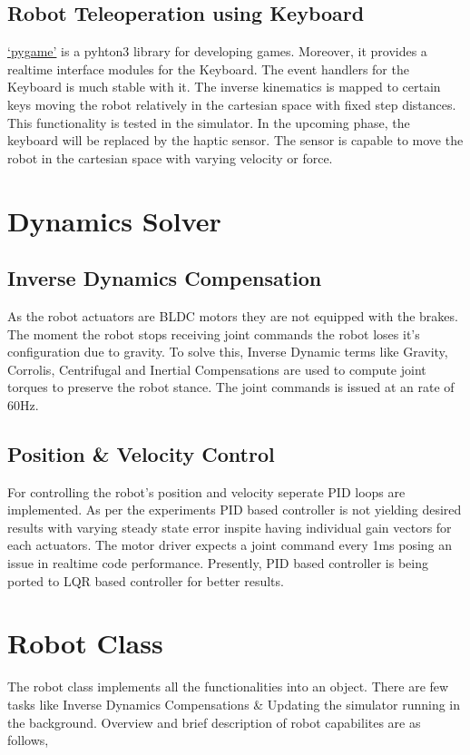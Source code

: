 \documentclass[12pt]{article}
\begin{document}
        \subsection{Robot Teleoperation using Keyboard}
            \href{https://www.pygame.org/docs/}{`pygame'} is a pyhton3 library for developing games. 
            Moreover, it provides a realtime interface modules for the Keyboard. The event handlers for the Keyboard is much stable with it.
            The inverse kinematics is mapped to certain keys moving the robot relatively in the cartesian space with fixed step distances. 
            This functionality is tested in the simulator. In the upcoming phase, the keyboard will be replaced by the haptic sensor.
            The sensor is capable to move the robot in the cartesian space with varying velocity or force.

\section{Dynamics Solver}
    \subsection{Inverse Dynamics Compensation}
        As the robot actuators are BLDC motors they are not equipped with the brakes. 
        The moment the robot stops receiving joint commands the robot loses it's configuration due to gravity.
        To solve this, Inverse Dynamic terms like Gravity, Corrolis, Centrifugal and Inertial Compensations are used to compute joint torques to preserve the robot stance.
        The joint commands is issued at an rate of 60Hz.

    \subsection{Position \& Velocity Control}
        For controlling the robot's position and velocity seperate PID loops are implemented. 
        As per the experiments PID based controller is not yielding desired results with varying steady state error inspite having individual gain vectors for each actuators.
        The motor driver expects a joint command every 1ms posing an issue in realtime code performance.
        Presently, PID based controller is being ported to LQR based controller for better results.  

\section{Robot Class}
    The robot class implements all the functionalities into an object. 
    There are few tasks like Inverse Dynamics Compensations \& Updating the simulator running in the background.
    Overview and brief description of robot capabilites are as follows,
\end{document}
